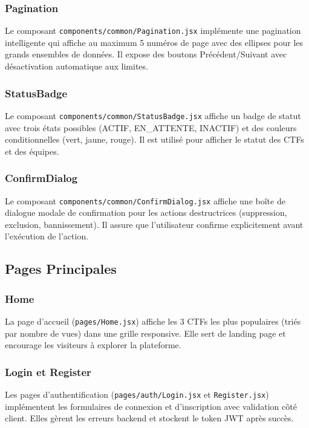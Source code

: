 \subsubsection{Pagination}

Le composant \texttt{components/common/Pagination.jsx} implémente une pagination intelligente qui affiche au maximum 5 numéros de page avec des ellipses pour les grands ensembles de données. Il expose des boutons Précédent/Suivant avec désactivation automatique aux limites.

\subsubsection{StatusBadge}

Le composant \texttt{components/common/StatusBadge.jsx} affiche un badge de statut avec trois états possibles (ACTIF, EN\_ATTENTE, INACTIF) et des couleurs conditionnelles (vert, jaune, rouge). Il est utilisé pour afficher le statut des CTFs et des équipes.

\subsubsection{ConfirmDialog}

Le composant \texttt{components/common/ConfirmDialog.jsx} affiche une boîte de dialogue modale de confirmation pour les actions destructrices (suppression, exclusion, bannissement). Il assure que l'utilisateur confirme explicitement avant l'exécution de l'action.

\subsection{Pages Principales}

\subsubsection{Home}

La page d'accueil (\texttt{pages/Home.jsx}) affiche les 3 CTFs les plus populaires (triés par nombre de vues) dans une grille responsive. Elle sert de landing page et encourage les visiteurs à explorer la plateforme.

\subsubsection{Login et Register}

Les pages d'authentification (\texttt{pages/auth/Login.jsx} et \texttt{Register.jsx}) implémentent les formulaires de connexion et d'inscription avec validation côté client. Elles gèrent les erreurs backend et stockent le token JWT après succès.

